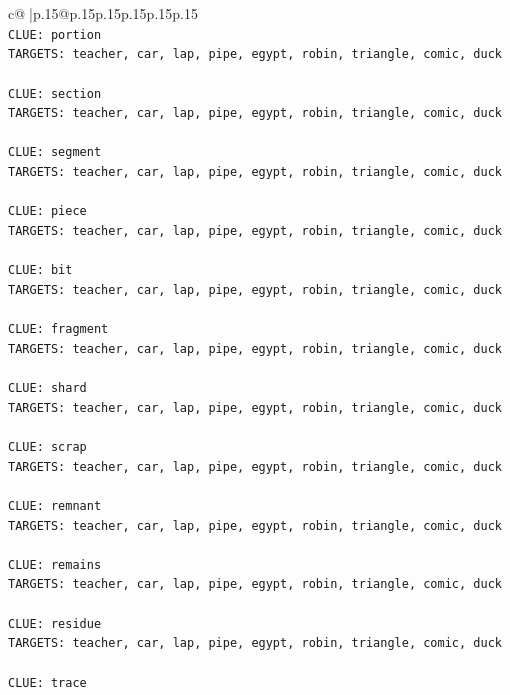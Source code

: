 \documentclass{article}
\begin{document}
{\begin{supertabular}{c@{$\;$}|p{.15\linewidth}@{}p{.15\linewidth}p{.15\linewidth}p{.15\linewidth}p{.15\linewidth}p{.15\linewidth}}
{{{\\ 
\texttt{CLUE: portion} \\
\texttt{TARGETS: teacher, car, lap, pipe, egypt, robin, triangle, comic, duck} \\
\\ 
\texttt{CLUE: section} \\
\texttt{TARGETS: teacher, car, lap, pipe, egypt, robin, triangle, comic, duck} \\
\\ 
\texttt{CLUE: segment} \\
\texttt{TARGETS: teacher, car, lap, pipe, egypt, robin, triangle, comic, duck} \\
\\ 
\texttt{CLUE: piece} \\
\texttt{TARGETS: teacher, car, lap, pipe, egypt, robin, triangle, comic, duck} \\
\\ 
\texttt{CLUE: bit} \\
\texttt{TARGETS: teacher, car, lap, pipe, egypt, robin, triangle, comic, duck} \\
\\ 
\texttt{CLUE: fragment} \\
\texttt{TARGETS: teacher, car, lap, pipe, egypt, robin, triangle, comic, duck} \\
\\ 
\texttt{CLUE: shard} \\
\texttt{TARGETS: teacher, car, lap, pipe, egypt, robin, triangle, comic, duck} \\
\\ 
\texttt{CLUE: scrap} \\
\texttt{TARGETS: teacher, car, lap, pipe, egypt, robin, triangle, comic, duck} \\
\\ 
\texttt{CLUE: remnant} \\
\texttt{TARGETS: teacher, car, lap, pipe, egypt, robin, triangle, comic, duck} \\
\\ 
\texttt{CLUE: remains} \\
\texttt{TARGETS: teacher, car, lap, pipe, egypt, robin, triangle, comic, duck} \\
\\ 
\texttt{CLUE: residue} \\
\texttt{TARGETS: teacher, car, lap, pipe, egypt, robin, triangle, comic, duck} \\
\\ 
\texttt{CLUE: trace} \\
}}}
\end{supertabular}}
\end{document}
